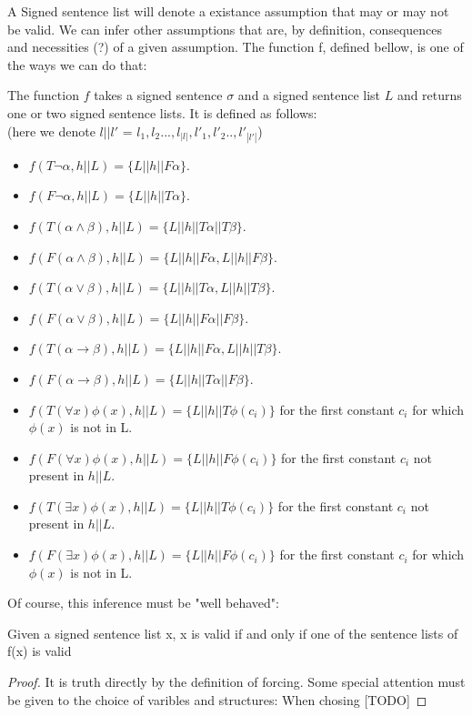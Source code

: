 \documentclass[runningheads]{llncs}
\begin{document}
A Signed sentence list will denote a existance assumption that may or may not be valid. We can infer other assumptions that are, by definition, 
consequences and necessities (?) of a given assumption. The function f, defined bellow, is one of the ways we can do that: 
\begin{definition}
    The function $f$ takes a signed sentence $\sigma$ and a signed sentence list $L$ and returns one or two signed sentence lists. It is defined as follows:
    \\(here we denote $l||l'$ = $l_1,l_2...,l_{|l|}, l'_1,l'_2..,l'_{|l'|} $)
    \begin{itemize}
        \item $f(T \neg \alpha, h||L) = \{L || h || F \alpha\}$.
        \item $f(F \neg \alpha, h||L) = \{L || h || T \alpha\}$.
        \item $f(T (\alpha \land \beta), h||L) = \{L || h || T \alpha || T \beta\}$.
        \item $f(F (\alpha \land \beta), h||L) = \{L || h || F \alpha, L || h || F \beta\}$.
        \item $f(T (\alpha \lor \beta), h||L) = \{L || h || T \alpha, L || h || T \beta\}$.
        \item $f(F (\alpha \lor \beta), h||L) = \{L || h || F \alpha || F \beta\}$.
        \item $f(T (\alpha \to \beta), h||L) = \{L || h || F \alpha, L || h || T \beta\}$.
        \item $f(F (\alpha \to \beta), h||L) = \{L || h || T \alpha || F \beta\}$.
        \item $f(T (\forall x) \phi(x), h||L) = \{L || h || T \phi(c_i) \}$ for the first constant $c_i$ for which $\phi(x)$ is not in L.
        \item $f(F (\forall x) \phi(x), h||L) = \{L || h || F \phi(c_i) \}$ for the first constant $c_i$ not present in $h||L$.
        \item $f(T (\exists x) \phi(x), h||L) = \{L || h || T \phi(c_i) \}$ for the first constant $c_i$ not present in $h||L$.
        \item $f(F (\exists x) \phi(x), h||L) = \{L || h || F \phi(c_i) \}$ for the first constant $c_i$ for which $\phi(x)$ is not in L.
    \end{itemize}
\end{definition}

Of course, this inference must be "well behaved":
\begin{theorem}
    Given a signed sentence list x, x is valid if and only if one of the sentence lists of f(x) is valid 
\end{theorem}
\begin{proof}
    It is truth directly by the definition of forcing. Some special attention must be given to the choice of varibles and structures: 
    When chosing [TODO]
\end{proof}
\end{document}

